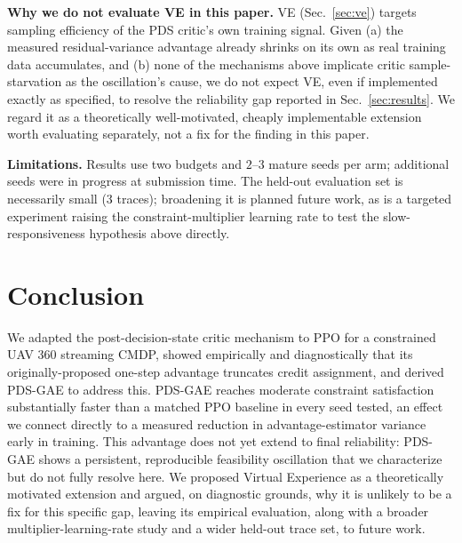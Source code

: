\documentclass[conference]{IEEEtran}
\begin{document}
\textbf{Why we do not evaluate VE in this paper.} VE (Sec.~\ref{sec:ve}) targets
sampling efficiency of the PDS critic's own training signal. Given (a) the measured
residual-variance advantage already shrinks on its own as real training data
accumulates, and (b) none of the mechanisms above implicate critic sample-starvation as
the oscillation's cause, we do not expect VE, even if implemented exactly as specified,
to resolve the reliability gap reported in Sec.~\ref{sec:results}. We regard it as a
theoretically well-motivated, cheaply implementable extension worth evaluating
separately, not a fix for the finding in this paper.

\textbf{Limitations.} Results use two budgets and $2$--$3$ mature seeds per
arm; additional seeds were in progress at submission time. %
The held-out evaluation set is necessarily small (3 traces); broadening it is planned
future work, as is a targeted experiment raising the constraint-multiplier learning
rate to test the slow-responsiveness hypothesis above directly.

\section{Conclusion}

We adapted the post-decision-state critic mechanism to PPO for a constrained UAV
360\textdegree{} streaming CMDP, showed empirically and diagnostically that its
originally-proposed one-step advantage truncates credit assignment, and derived
PDS-GAE to address this. PDS-GAE reaches moderate constraint satisfaction
substantially faster than a matched PPO baseline in every seed tested, an effect we
connect directly to a measured reduction in advantage-estimator variance early in
training. This advantage does not yet extend to final reliability: PDS-GAE shows a
persistent, reproducible feasibility oscillation that we characterize but do not fully
resolve here. We proposed Virtual Experience as a theoretically motivated extension and
argued, on diagnostic grounds, why it is unlikely to be a fix for this specific gap,
leaving its empirical evaluation, along with a broader multiplier-learning-rate study
and a wider held-out trace set, to future work.
\end{document}
